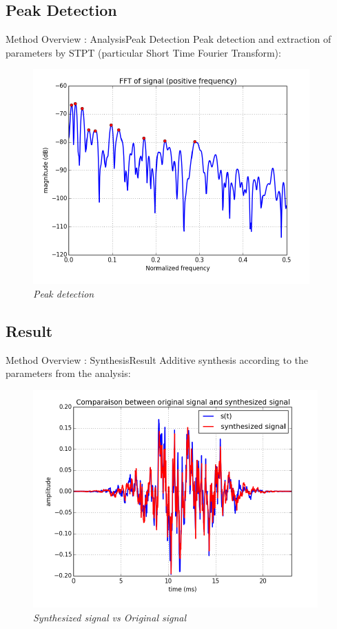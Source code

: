 \documentclass[10pt]{beamer}
\begin{document}
\subsection{Peak Detection}
\begin{frame}{Method Overview : Analysis}{Peak Detection}
Peak detection and extraction of parameters by STPT (particular Short Time Fourier Transform):
\begin{figure}
	\centerline
	{\includegraphics[scale=0.5]{slide2.png}}
	\caption{\it Peak detection}
\end{figure}
\end{frame}
\subsection{Result}
\begin{frame}{Method Overview : Synthesis}{Result}
Additive synthesis according to the parameters from the analysis:
\begin{figure}
	\centerline
	{\includegraphics[scale=0.5]{synthesisstep.png}}
	\caption{\it Synthesized signal vs Original signal}
\end{figure}
\end{frame}
\end{document}
